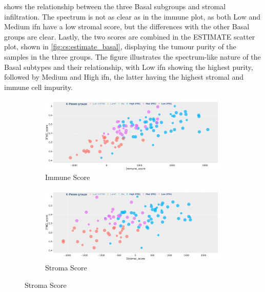  shows the relationship between the three Basal subgroups and stromal infiltration. The spectrum is not as clear as in the immune plot, as both Low and Medium \acrshort{ifn} have a low stromal score, but the differences with the other Basal groups are clear. Lastly, the two scores are combined in the ESTIMATE scatter plot, shown in \cref{fig:cs:estimate_basal}, displaying the tumour purity of the samples in the three groups. The figure illustrates the spectrum-like nature of the Basal subtypes and their relationship, with Low \acrshort{ifn} showing the highest purity, followed by Medium and High \acrshort{ifn}, the latter having the highest stromal and immune cell impurity.


\begin{figure}[H]
    \captionsetup{font=small} 
    \centering
    \begin{subfigure}[!t]{0.89\textwidth}
        \includegraphics[width=\textwidth,keepaspectratio]{Sections/ClusteringAnalysis/Resources/discussion/Immune_spectrum.png}    
        \caption{Immune Score}
        \label{fig:cs:immune_basal}
    \end{subfigure}
    \centering
    \begin{subfigure}[!t]{0.89\textwidth}
        \includegraphics[width=\textwidth,keepaspectratio]{Sections/ClusteringAnalysis/Resources/discussion/Stroma_spectrum.png}
        \caption{Stroma Score}
        \label{fig:cs:stroma_basal}
    \end{subfigure} 

\end{figure}
